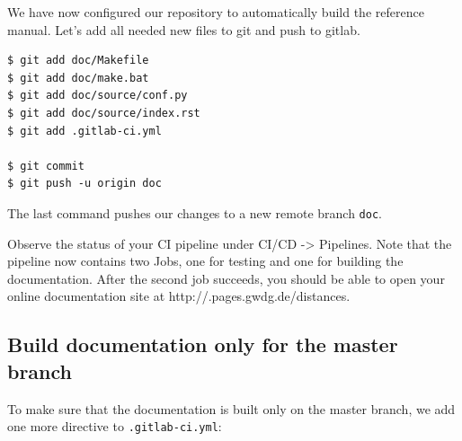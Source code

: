 \documentclass[11pt]{article}
\begin{document}
We have now configured our repository to automatically build the
reference manual. Let's add all needed new files to git and push to
gitlab.

\begin{verbatim}
$ git add doc/Makefile
$ git add doc/make.bat
$ git add doc/source/conf.py
$ git add doc/source/index.rst
$ git add .gitlab-ci.yml

$ git commit
$ git push -u origin doc
\end{verbatim}

The last command pushes our changes to a new remote branch \texttt{doc}.

Observe the status of your CI pipeline under CI/CD -\textgreater{}
Pipelines. Note that the pipeline now contains two Jobs, one for testing
and one for building the documentation. After the second job succeeds,
you should be able to open your online documentation site at
http://.pages.gwdg.de/distances.

\hypertarget{build-documentation-only-for-the-master-branch}{%
\subsection{Build documentation only for the master
branch}\label{build-documentation-only-for-the-master-branch}}

To make sure that the documentation is built only on the master branch,
we add one more directive to \texttt{.gitlab-ci.yml}:
\end{document}
